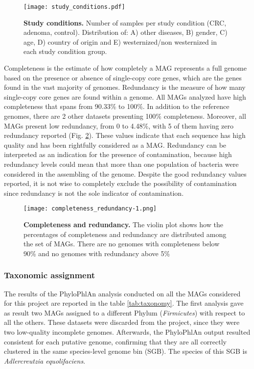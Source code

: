 \begin{figure}[!h]
    \centering
    \texttt{[image: study\_conditions.pdf]}
    \caption{\footnotesize{\textbf{Study conditions.} Number of samples per study condition (CRC, adenoma, control). Distribution of: A) other diseases, B) gender, C) age, D) country of origin and E) westernized/non westernized in each study condition group.}}
    \label{fig:studyConditions}
\end{figure}

Completeness is the estimate of how completely a MAG represents a full genome based on the presence or absence of single-copy core genes, which are the genes found in the vast majority of genomes. Redundancy is the measure of how many single-copy core genes are found within a genome\cite{anvio}. All MAGs analyzed have high completeness that spans from 90.33\% to 100\%. In addition to the reference genomes, there are 2 other datasets presenting 100\% completeness. Moreover, all MAGs present low redundancy, from 0 to 4.48\%, with 5 of them having zero redundancy reported (Fig. \ref{fig:completeness}). These values indicate that each sequence has high quality and has been rightfully considered as a MAG. Redundancy can be interpreted as an indication for the presence of contamination, because high redundancy levels could mean that more than one population of bacteria were considered in the assembling of the genome. Despite the good redundancy values reported, it is not wise to completely exclude the possibility of contamination since redundancy is not the sole indicator of contamination.

\begin{figure}[!h]
    \centering
    \texttt{[image: completeness\_redundancy-1.png]}
    \caption{\footnotesize{\textbf{Completeness and redundancy.} The violin plot shows how the percentages of completeness and redundancy are distributed among the set of MAGs. There are no genomes with completeness below 90\% and no genomes with redundancy above 5\%}}
    \label{fig:completeness}
\end{figure}

\subsubsection*{Taxonomic assignment}

The results of the PhyloPhlAn analysis conducted on all the MAGs considered for this project are reported in the table \ref{tab:taxonomy}. The first analysis gave as result two MAGs assigned to a different Phylum (\textit{Firmicutes}) with respect to all the others. These datasets were discarded from the project, since they were two low-quality incomplete genomes. Afterwards, the PhyloPhlAn output resulted consistent for each putative genome, confirming that they are all correctly clustered in the same species-level genome bin (SGB). The species of this SGB is \textit{Adlercreutzia equolifaciens}.\\


